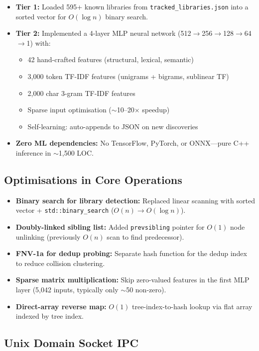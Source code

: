 \documentclass[12pt, a4paper]{article}
\begin{document}
\begin{itemize}
  \item \textbf{Tier 1:} Loaded 595+ known libraries from \texttt{tracked\_libraries.json} into a sorted vector for $O(\log n)$ binary search.
  \item \textbf{Tier 2:} Implemented a 4-layer MLP neural network (512$\to$256$\to$128$\to$64$\to$1) with:
    \begin{itemize}
      \item 42 hand-crafted features (structural, lexical, semantic)
      \item 3,000 token TF-IDF features (unigrams + bigrams, sublinear TF)
      \item 2,000 char 3-gram TF-IDF features
      \item Sparse input optimisation ($\sim$10--20$\times$ speedup)
      \item Self-learning: auto-appends to JSON on new discoveries
    \end{itemize}
  \item \textbf{Zero ML dependencies:} No TensorFlow, PyTorch, or ONNX---pure C++ inference in $\sim$1,500 LOC.
\end{itemize}

\subsection{Optimisations in Core Operations}

\begin{itemize}
  \item \textbf{Binary search for library detection:} Replaced linear scanning with sorted vector + \texttt{std::binary\_search} ($O(n) \to O(\log n)$).
  \item \textbf{Doubly-linked sibling list:} Added \texttt{prevsibling} pointer for $O(1)$ node unlinking (previously $O(n)$ scan to find predecessor).
  \item \textbf{FNV-1a for dedup probing:} Separate hash function for the dedup index to reduce collision clustering.
  \item \textbf{Sparse matrix multiplication:} Skip zero-valued features in the first MLP layer (5,042 inputs, typically only $\sim$50 non-zero).
  \item \textbf{Direct-array reverse map:} $O(1)$ tree-index-to-hash lookup via flat array indexed by tree index.
\end{itemize}

\subsection{Unix Domain Socket IPC}
\end{document}

